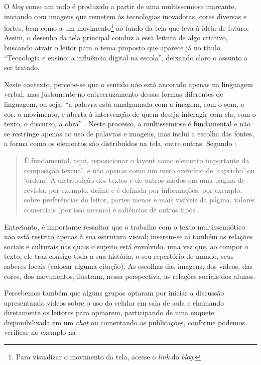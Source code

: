 \documentclass{textolivre}
\begin{document}
O \emph{blog} como um todo é produzido a partir de uma multissemiose marcante, iniciando com imagens que remetem às tecnologias inovadoras, cores diversas e fortes, bem como a um movimento\footnote{Para visualizar o movimento da tela, acesse o \emph{link} do \emph{blog}.} ao fundo da tela que leva à ideia de futuro. Assim, o desenho da tela principal conduz a essa leitura de algo criativo, buscando atrair o leitor para o tema proposto que aparece já no título “Tecnologia e ensino: a influência digital na escola”, deixando claro o assunto a ser tratado.

Neste contexto, percebe-se que o sentido não está ancorado apenas na linguagem verbal, mas justamente no entrecruzamento dessas formas diferentes de linguagem, ou seja, “a palavra está amalgamada com a imagem, com o som, a cor, o movimento, e aberta à intervenção de quem deseja interagir com ela, com o texto, o discurso, a obra” \cite[p. 57]{dalmolin2003}. Neste processo, a multissemiose é fundamental e não se restringe apenas ao uso de palavras e imagens, mas inclui a escolha das fontes, a forma como os elementos são distribuídos na tela, entre outras. Segundo \textcite{ribeiro2018}:

\begin{quote}
É fundamental, aqui, reposicionar o layout como elemento importante da composição textual, e não apenas como um mero exercício de ‘capricho’ ou ‘ordem’. A distribuição dos textos e de outros modos em uma página de revista, por exemplo, define e é definida por informações, por exemplo, sobre preferências do leitor, partes menos e mais visíveis da página, valores comerciais (por isso mesmo) e saliências de outros tipos \cite[p. 92]{ribeiro2018}.
\end{quote}

Entretanto, é importante ressaltar que o trabalho com o texto multissemiótico não está restrito apenas à sua estrutura visual; inserem-se aí também as relações sociais e culturais nas quais o sujeito está envolvido, uma vez que, ao compor o texto, ele traz consigo toda a sua história, o seu repertório de mundo, seus saberes locais (colocar alguma citação). As escolhas das imagens, dos vídeos, das cores, dos movimentos, ilustram, nessa perspectiva, as relações sociais dos alunos.

Percebemos também que alguns grupos optaram por iniciar a discussão apresentando vídeos sobre o uso do celular em sala de aula e chamando diretamente os leitores para opinarem, participando de uma enquete disponibilizada em um \emph{chat} ou comentando as publicações, conforme podemos verificar no exemplo na .
\end{document}
